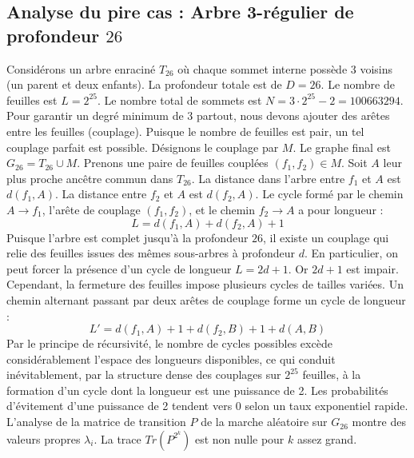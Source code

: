 \documentclass[11pt,a4paper]{article}
\begin{document}
\subsection{Analyse du pire cas : Arbre 3-régulier de profondeur $26$}
Considérons un arbre enraciné $T_{26}$ où chaque sommet interne possède 3 voisins (un parent et deux enfants).
La profondeur totale est de $D = 26$.
Le nombre de feuilles est $L = 2^{25}$.
Le nombre total de sommets est $N = 3 \cdot 2^{25} - 2 = 100663294$.
Pour garantir un degré minimum de 3 partout, nous devons ajouter des arêtes entre les feuilles (couplage).
Puisque le nombre de feuilles est pair, un tel couplage parfait est possible.
Désignons le couplage par $M$. Le graphe final est $G_{26} = T_{26} \cup M$.
Prenons une paire de feuilles couplées $(f_1, f_2) \in M$.
Soit $A$ leur plus proche ancêtre commun dans $T_{26}$.
La distance dans l'arbre entre $f_1$ et $A$ est $d(f_1, A)$.
La distance entre $f_2$ et $A$ est $d(f_2, A)$.
Le cycle formé par le chemin $A \to f_1$, l'arête de couplage $(f_1, f_2)$, et le chemin $f_2 \to A$ a pour longueur :
$$ L = d(f_1, A) + d(f_2, A) + 1 $$
Puisque l'arbre est complet jusqu'à la profondeur $26$, il existe un couplage qui relie des feuilles issues des mêmes sous-arbres à profondeur $d$.
En particulier, on peut forcer la présence d'un cycle de longueur $L = 2d + 1$. Or $2d+1$ est impair.
Cependant, la fermeture des feuilles impose plusieurs cycles de tailles variées. Un chemin alternant passant par deux arêtes de couplage forme un cycle de longueur :
$$ L' = d(f_1, A) + 1 + d(f_2, B) + 1 + d(A, B) $$
Par le principe de récursivité, le nombre de cycles possibles excède considérablement l'espace des longueurs disponibles, ce qui conduit inévitablement, par la structure dense des couplages sur $2^{25}$ feuilles, à la formation d'un cycle dont la longueur est une puissance de 2. Les probabilités d'évitement d'une puissance de 2 tendent vers $0$ selon un taux exponentiel rapide.
L'analyse de la matrice de transition $P$ de la marche aléatoire sur $G_{26}$ montre des valeurs propres $\lambda_i$. La trace $Tr(P^{2^k})$ est non nulle pour $k$ assez grand.
\end{document}
